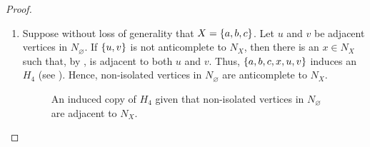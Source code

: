 \begin{proof}
\begin{enumerate}[label=(\roman*)]
            It follows that $N_\varnothing$ is anticomplete to at least one
            between $N_{abc}$ and $N_{ac}$. Since  ensures that
            $N_{abc}$, $N_{acd}$ and $N_{ac}$ are anticomplete to each other,
            the aforementioned arguments works for any pair of these three bags,
            noting the $P_5$ that arises does not use the fact that the bags are
            adjacent or nonadjacent to $a$ and $c$. Thus, $N_\varnothing$ is
            anticomplete to all but at most one bag between $N_{abc}$, $N_{acd}$
            and $N_{ac}$.

        \item Suppose without loss of generality that $X=\left\{a,b,c\right\}$. Let $u$ and
            $v$ be adjacent vertices in $N_\varnothing$. If $\left\{u,v\right\}$ is not
            anticomplete to $N_X$, then there is an $x\in N_X$ such that, by
            , is adjacent to both $u$ and $v$. Thus,
            $\left\{a,b,c,x,u,v\right\}$ induces an $H_4$ (see ). Hence,
            non-isolated vertices in $N_\varnothing$ are anticomplete to
            $N_{X}$.

            \begin{figure}[htb!]
                \centering
                \caption{An induced copy of $H_4$ given that non-isolated
                    vertices in $N_\varnothing$ are adjacent to $N_X$.}
                \label{fig:type_10}
            \end{figure}
    \end{enumerate}
\end{proof}

